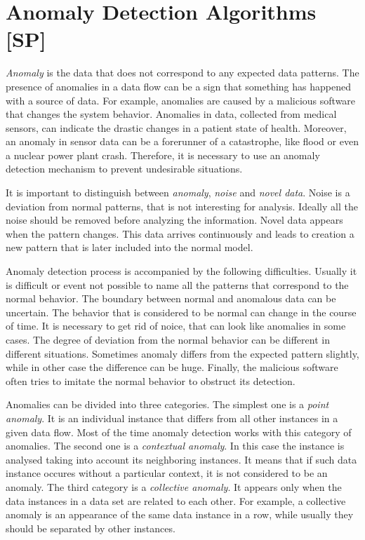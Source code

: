 \section{Anomaly Detection Algorithms [SP]}

\textit{Anomaly} is the data that does not correspond to any expected data patterns.
The presence of anomalies in a data flow can be a sign that something has happened with a source of data.
For example, anomalies are caused by a malicious software that changes the system behavior. 
Anomalies in data, collected from medical sensors, can indicate the drastic changes in a patient state of health.
Moreover, an anomaly in sensor data can be a forerunner of a catastrophe, like flood or even a nuclear power plant crash.
Therefore, it is necessary to use an anomaly detection mechanism to prevent undesirable situations.

It is important to distinguish between \textit{anomaly}, \textit{noise} and \textit{novel data}.
Noise is a deviation from normal patterns, that is not interesting for analysis.
Ideally all the noise should be removed before analyzing the information.
Novel data appears when the pattern changes.
This data arrives continuously and leads to creation a new pattern that is later included into the normal model.  

Anomaly detection process is accompanied by the following difficulties.
Usually it is difficult or event not possible to name all the patterns that correspond to the normal behavior.
The boundary between normal and anomalous data can be uncertain.
The behavior that is considered to be normal can change in the course of time.
It is necessary to get rid of noice, that can look like anomalies in some cases.
The degree of deviation from the normal behavior can be different in different situations.
Sometimes anomaly differs from the expected pattern slightly, while in other case the difference can be huge.
Finally, the malicious software often tries to imitate the normal behavior to obstruct its detection. 

Anomalies can be divided into three categories.
The simplest one is a \textit{point anomaly}.
It is an individual instance that differs from all other instances in a given data flow.
Most of the time anomaly detection works with this category of anomalies.
The second one is a \textit{contextual anomaly}.
In this case the instance is analysed taking into account its neighboring instances.
It means that if such data instance occures without a particular context, it is not considered to be an anomaly.
The third category is a \textit{collective anomaly}.
It appears only when the data instances in a data set are related to each other.
For example, a collective anomaly is an appearance of the same data instance in a row, while usually they should be separated by other instances.

